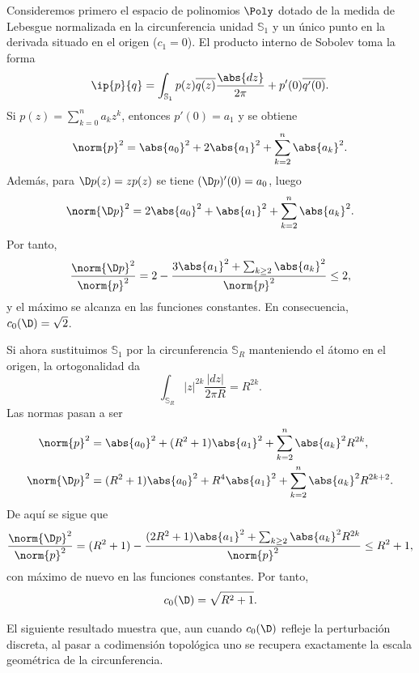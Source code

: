 \begin{exm}
	Consideremos primero el espacio de polinomios $\Poly$ dotado de la medida de Lebesgue normalizada en la circunferencia unidad $\mathbb{S}_1$ y un único punto en la derivada situado en el origen ($c_1 = 0$). El producto interno de Sobolev toma la forma
	\begin{equation}
		\ip{p}{q} = \int_{\mathbb{S}_1} p(z)\overline{q(z)} \frac{\abs{dz}}{2\pi} + p'(0)\overline{q'(0)}.
	\end{equation}
	Si $p(z) = \sum_{k=0}^n a_k z^k$, entonces $p'(0) = a_1$ y se obtiene
	\begin{equation} \label{eq:norma_in_0}
		\norm{p}^2 = \abs{a_0}^2 + 2\abs{a_1}^2 + \sum_{k=2}^n \abs{a_k}^2.
	\end{equation}
	Además, para $\D p(z) = z p(z)$ se tiene $(\D p)'(0) = a_0$, luego
	\begin{equation} \label{eq:norma_out_0}
		\norm{\D p}^2 = 2\abs{a_0}^2 + \abs{a_1}^2 + \sum_{k=2}^n \abs{a_k}^2.
	\end{equation}
	Por tanto,
	\begin{equation}
		\frac{\norm{\D p}^2}{\norm{p}^2} = 2 - \frac{3\abs{a_1}^2 + \sum_{k \ge 2} \abs{a_k}^2}{\norm{p}^2} \le 2,
	\end{equation}
	y el máximo se alcanza en las funciones constantes. En consecuencia, $c_0(\D) = \sqrt{2}$.

	Si ahora sustituimos $\mathbb{S}_1$ por la circunferencia $\mathbb{S}_R$ manteniendo el átomo en el origen, la ortogonalidad da
	\[\int_{\mathbb{S}_R} |z|^{2k} \frac{|dz|}{2\pi R} = R^{2k}.\]
	Las normas pasan a ser
	\begin{align}
		\norm{p}^2    & = \abs{a_0}^2 + (R^2 + 1)\abs{a_1}^2 + \sum_{k=2}^n \abs{a_k}^2 R^{2k}, \label{eq:norma_in_0_R}       \\
		\norm{\D p}^2 & = (R^2 + 1)\abs{a_0}^2 + R^4\abs{a_1}^2 + \sum_{k=2}^n \abs{a_k}^2 R^{2k+2}. \label{eq:norma_out_0_R}
	\end{align}
	De aquí se sigue que
	\begin{equation}
		\frac{\norm{\D p}^2}{\norm{p}^2} = (R^2 + 1) - \frac{(2R^2 + 1)\abs{a_1}^2 + \sum_{k \ge 2} \abs{a_k}^2 R^{2k}}{\norm{p}^2} \le R^2 + 1,
	\end{equation}
	con máximo de nuevo en las funciones constantes. Por tanto,
	\[
		c_0(\D) = \sqrt{R^2 + 1}.
	\]
\end{exm}

El siguiente resultado muestra que, aun cuando $c_0(\D)$ refleje la perturbación discreta, al pasar a codimensión topológica uno se recupera exactamente la escala geométrica de la circunferencia.

